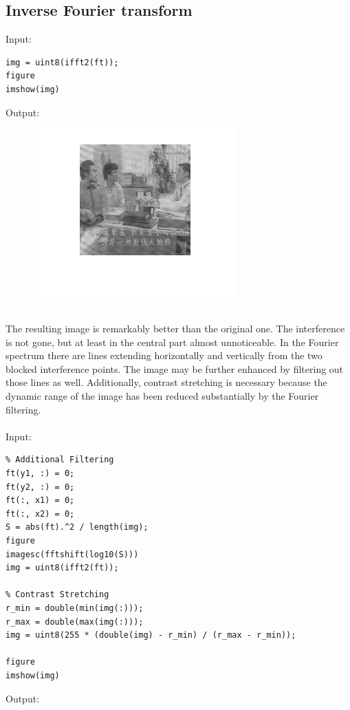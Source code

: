 \documentclass[12pt, a4paper]{article}
\begin{document}
\subsection{Inverse Fourier transform}
Input:
\begin{verbatim}
img = uint8(ifft2(ft));
figure
imshow(img)
\end{verbatim}
\newpage
Output:
\begin{figure}[H]
    \centering
    \includegraphics[width=0.7\textwidth]{fig25.png}
\end{figure}
~\\[-15mm]
The resulting image is remarkably better than the original one. The interference is not gone, but at least in the central part almost unnoticeable. In the Fourier spectrum there are lines extending horizontally and vertically from the two blocked interference points. The image may be further enhanced by filtering out those lines as well. Additionally, contrast stretching is necessary because the dynamic range of the image has been reduced substantially by the Fourier filtering.
\\\\
Input:
\begin{verbatim}
% Additional Filtering
ft(y1, :) = 0;
ft(y2, :) = 0;
ft(:, x1) = 0;
ft(:, x2) = 0;
S = abs(ft).^2 / length(img);
figure
imagesc(fftshift(log10(S)))
img = uint8(ifft2(ft));

% Contrast Stretching
r_min = double(min(img(:)));
r_max = double(max(img(:)));
img = uint8(255 * (double(img) - r_min) / (r_max - r_min));

figure
imshow(img)
\end{verbatim}
Output:
\end{document}
